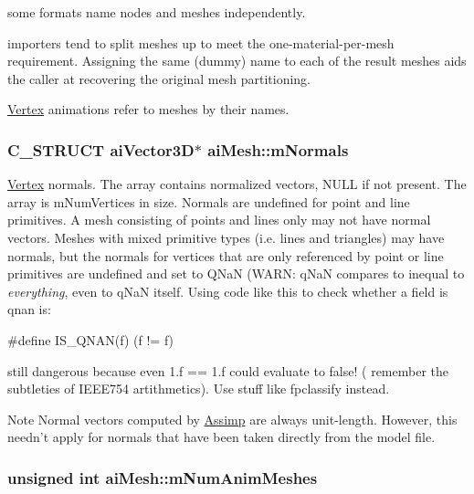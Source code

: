 \begin{DoxyItemize}
\item some formats name nodes and meshes independently.
\item importers tend to split meshes up to meet the one-\/material-\/per-\/mesh requirement. Assigning the same (dummy) name to each of the result meshes aids the caller at recovering the original mesh partitioning.
\item \hyperlink{struct_vertex}{Vertex} animations refer to meshes by their names. 
\end{DoxyItemize}\hypertarget{structai_mesh_aec81b496b4d93838cef038933dabe9b9}{
\subsubsection[{m\+Normals}]{\setlength{\rightskip}{0pt plus 5cm}C\+\_\+\+S\+T\+R\+U\+C\+T {\bf ai\+Vector3\+D}$\ast$ ai\+Mesh\+::m\+Normals}}\label{structai_mesh_aec81b496b4d93838cef038933dabe9b9}
\hyperlink{struct_vertex}{Vertex} normals. The array contains normalized vectors, N\+U\+L\+L if not present. The array is m\+Num\+Vertices in size. Normals are undefined for point and line primitives. A mesh consisting of points and lines only may not have normal vectors. Meshes with mixed primitive types (i.\+e. lines and triangles) may have normals, but the normals for vertices that are only referenced by point or line primitives are undefined and set to Q\+Na\+N (W\+A\+R\+N\+: q\+Na\+N compares to inequal to {\itshape everything}, even to q\+Na\+N itself. Using code like this to check whether a field is qnan is\+: 
\begin{DoxyCode}
\textcolor{preprocessor}{#define IS\_QNAN(f) (f != f)}
\end{DoxyCode}
 still dangerous because even 1.\+f == 1.\+f could evaluate to false! ( remember the subtleties of I\+E\+E\+E754 artithmetics). Use stuff like {\ttfamily fpclassify} instead. \begin{DoxyNote}{Note}
Normal vectors computed by \hyperlink{class_assimp}{Assimp} are always unit-\/length. However, this needn't apply for normals that have been taken directly from the model file. 
\end{DoxyNote}
\hypertarget{structai_mesh_a1692a300222b32348ae51779df4a697e}{
\subsubsection[{m\+Num\+Anim\+Meshes}]{\setlength{\rightskip}{0pt plus 5cm}unsigned int ai\+Mesh\+::m\+Num\+Anim\+Meshes}}\label{structai_mesh_a1692a300222b32348ae51779df4a697e}
